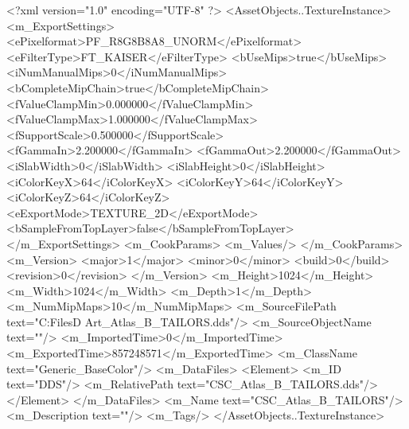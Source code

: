 <?xml version="1.0" encoding="UTF-8" ?>
<AssetObjects..TextureInstance>
	<m_ExportSettings>
		<ePixelformat>PF_R8G8B8A8_UNORM</ePixelformat>
		<eFilterType>FT_KAISER</eFilterType>
		<bUseMips>true</bUseMips>
		<iNumManualMips>0</iNumManualMips>
		<bCompleteMipChain>true</bCompleteMipChain>
		<fValueClampMin>0.000000</fValueClampMin>
		<fValueClampMax>1.000000</fValueClampMax>
		<fSupportScale>0.500000</fSupportScale>
		<fGammaIn>2.200000</fGammaIn>
		<fGammaOut>2.200000</fGammaOut>
		<iSlabWidth>0</iSlabWidth>
		<iSlabHeight>0</iSlabHeight>
		<iColorKeyX>64</iColorKeyX>
		<iColorKeyY>64</iColorKeyY>
		<iColorKeyZ>64</iColorKeyZ>
		<eExportMode>TEXTURE_2D</eExportMode>
		<bSampleFromTopLayer>false</bSampleFromTopLayer>
	</m_ExportSettings>
	<m_CookParams>
		<m_Values/>
	</m_CookParams>
	<m_Version>
		<major>1</major>
		<minor>0</minor>
		<build>0</build>
		<revision>0</revision>
	</m_Version>
	<m_Height>1024</m_Height>
	<m_Width>1024</m_Width>
	<m_Depth>1</m_Depth>
	<m_NumMipMaps>10</m_NumMipMaps>
	<m_SourceFilePath text="C:\Users\Shadow\Desktop\Working Files\3D Art\Textures\CSC_Atlas_B_TAILORS.dds"/>
	<m_SourceObjectName text=""/>
	<m_ImportedTime>0</m_ImportedTime>
	<m_ExportedTime>857248571</m_ExportedTime>
	<m_ClassName text="Generic_BaseColor"/>
	<m_DataFiles>
		<Element>
			<m_ID text="DDS"/>
			<m_RelativePath text="CSC_Atlas_B_TAILORS.dds"/>
		</Element>
	</m_DataFiles>
	<m_Name text="CSC_Atlas_B_TAILORS"/>
	<m_Description text=""/>
	<m_Tags/>
</AssetObjects..TextureInstance>

